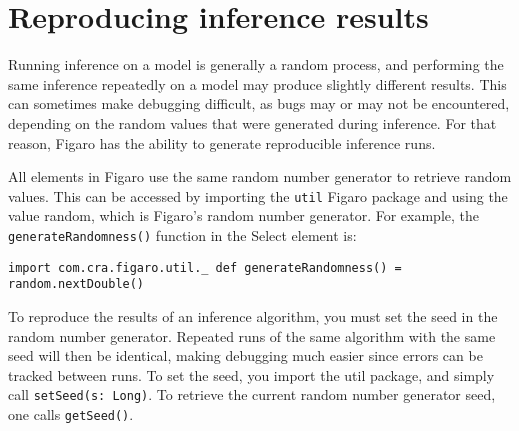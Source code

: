 \section{Reproducing inference results}

Running inference on a model is generally a random process, and performing the same inference repeatedly on a model may produce slightly different results. This can sometimes make debugging difficult, as bugs may or may not be encountered, depending on the random values that were generated during inference. For that reason, Figaro has the ability to generate reproducible inference runs.

All elements in Figaro use the same random number generator to retrieve random values. This can be accessed by importing the \texttt{util} Figaro package and using the value random, which is Figaro's random number generator. For example, the \texttt{generateRandomness()} function in the Select element is:

\begin{flushleft}
\texttt{import com.cra.figaro.util.\_
\newline 
\newline def generateRandomness() = random.nextDouble()
}
\end{flushleft}

To reproduce the results of an inference algorithm, you must set the seed in the random number generator. Repeated runs of the same algorithm with the same seed will then be identical, making debugging much easier since errors can be tracked between runs. To set the seed, you import the util package, and simply call \texttt{setSeed(s: Long)}. To retrieve the current random number generator seed, one calls \texttt{getSeed()}.
